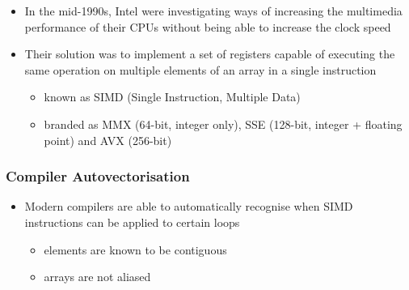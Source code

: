 \begin{itemize}
\itemsep1pt\parskip0pt
\item
  In the mid-1990s, Intel were investigating ways of increasing the
  multimedia performance of their CPUs without being able to increase
  the clock speed
\item
  Their solution was to implement a set of registers capable of
  executing the same operation on multiple elements of an array in a
  single instruction

  \begin{itemize}
  \itemsep1pt\parskip0pt
  \item
    known as SIMD (Single Instruction, Multiple Data)
  \item
    branded as MMX (64-bit, integer only), SSE (128-bit, integer +
    floating point) and AVX (256-bit)
  \end{itemize}
\end{itemize}

\subsubsection{Compiler
Autovectorisation}\label{compiler-autovectorisation}

\begin{itemize}
\itemsep1pt\parskip0pt
\item
  Modern compilers are able to automatically recognise when SIMD
  instructions can be applied to certain loops

  \begin{itemize}
  \itemsep1pt\parskip0pt
  \item
    elements are known to be contiguous
  \item
    arrays are not aliased
  \end{itemize}
\end{itemize}

\begin{Shaded}
\begin{Highlighting}[]

      
                 
     \NormalTok{)}
         \NormalTok{;}

      \NormalTok{) \{}
         \NormalTok{(} 
    \NormalTok{\}}
     \NormalTok{\{}
         \NormalTok{(} 
    \NormalTok{\}}

     \NormalTok{;}
\NormalTok{\}}
\end{Highlighting}
\end{Shaded}

